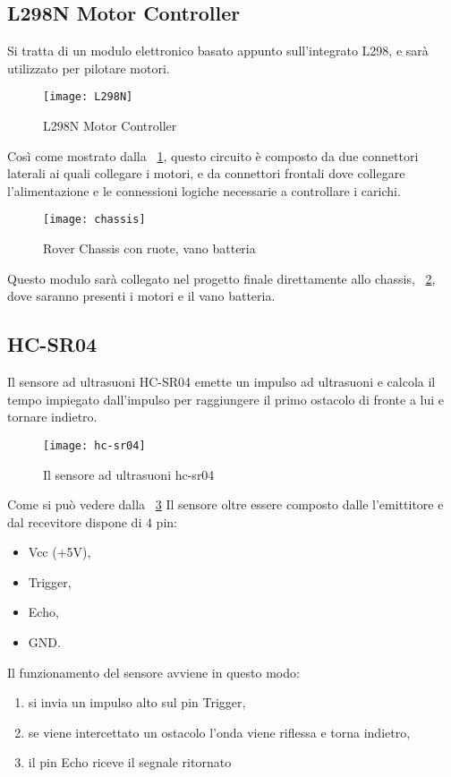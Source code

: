 \subsection{L298N Motor Controller}
Si tratta di un modulo elettronico basato appunto sull’integrato L298, e sarà utilizzato per pilotare motori.

\begin{figure}[htbp!] 
	\centering    
	\texttt{[image: L298N]}
	\caption[L298N Motor Controller]{L298N Motor Controller}
	\label{fig:L298N}
\end{figure}
Così come mostrato dalla \figurename~\ref{fig:L298N}, questo circuito è composto da due connettori laterali ai quali collegare i motori, e da connettori frontali dove collegare l’alimentazione e le connessioni logiche necessarie a controllare i carichi.

\begin{figure}[htbp!] 
	\centering    
	\texttt{[image: chassis]}
	\caption[Rover Chassis]{Rover Chassis con ruote, vano batteria}
	\label{fig:chassis}
\end{figure}
Questo modulo sarà collegato nel progetto finale direttamente allo chassis, \figurename~\ref{fig:chassis}, dove saranno presenti i motori e il vano batteria.


\subsection{HC-SR04}


Il  sensore ad ultrasuoni HC-SR04 emette un impulso ad ultrasuoni e calcola il tempo impiegato dall’impulso per raggiungere il primo ostacolo di fronte a lui e tornare indietro.


\begin{figure}[htbp!] 
	\centering    
	\texttt{[image: hc-sr04]}
	\caption[HC-SR04]{Il sensore ad ultrasuoni hc-sr04}
	\label{fig:hc-sr04}
\end{figure}
Come si può vedere dalla \figurename~\ref{fig:hc-sr04} Il sensore oltre essere composto dalle l'emittitore e dal recevitore dispone di 4 pin:
\begin{itemize}
 \item Vcc (+5V), 
 \item Trigger, 
 \item Echo, 
 \item GND. 
\end{itemize}

Il funzionamento del sensore avviene in questo modo:
\begin{enumerate}
 \item si invia un impulso alto sul pin Trigger,
 \item se viene intercettato un ostacolo l’onda viene riflessa e torna indietro,
 \item il pin Echo riceve il segnale ritornato
\end{enumerate}

